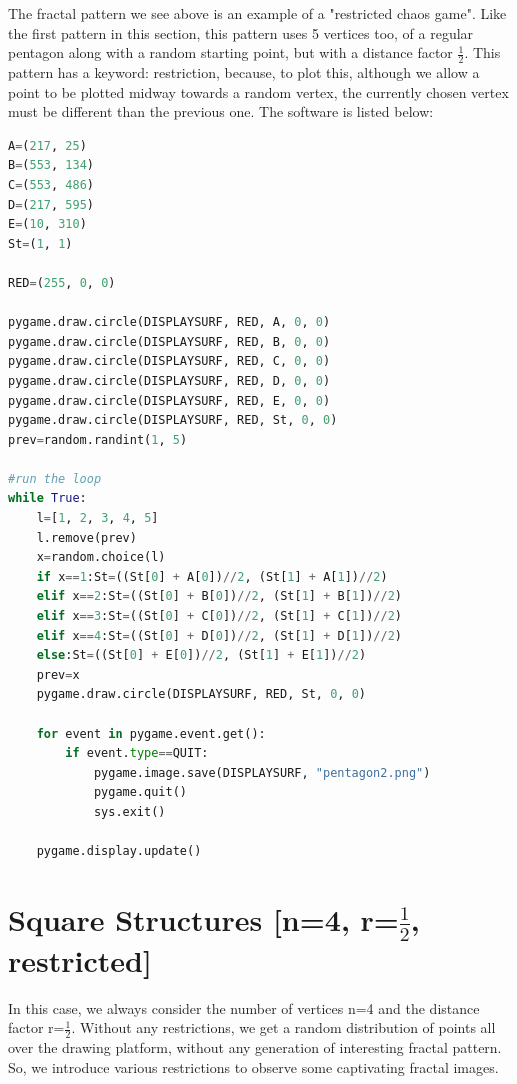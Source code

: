 \documentclass{article}
\begin{document}
The fractal pattern we see above is an example of a "restricted chaos game". Like the first pattern in this section, this pattern uses 5 vertices too, of a regular pentagon along with a random starting point, but with a distance factor $\frac{1}{2}$. This pattern has a keyword: restriction, because, to plot this, although we allow a point to be plotted midway towards a random vertex, the currently chosen vertex must be different than the previous one. The software is listed below:
\begin{lstlisting}[language=Python, frame=single]
A=(217, 25)
B=(553, 134)
C=(553, 486)
D=(217, 595)
E=(10, 310)
St=(1, 1)

RED=(255, 0, 0)

pygame.draw.circle(DISPLAYSURF, RED, A, 0, 0)
pygame.draw.circle(DISPLAYSURF, RED, B, 0, 0)
pygame.draw.circle(DISPLAYSURF, RED, C, 0, 0)
pygame.draw.circle(DISPLAYSURF, RED, D, 0, 0)
pygame.draw.circle(DISPLAYSURF, RED, E, 0, 0)
pygame.draw.circle(DISPLAYSURF, RED, St, 0, 0)
prev=random.randint(1, 5)

#run the loop
while True:
    l=[1, 2, 3, 4, 5]
    l.remove(prev)
    x=random.choice(l)
    if x==1:St=((St[0] + A[0])//2, (St[1] + A[1])//2)
    elif x==2:St=((St[0] + B[0])//2, (St[1] + B[1])//2)
    elif x==3:St=((St[0] + C[0])//2, (St[1] + C[1])//2)
    elif x==4:St=((St[0] + D[0])//2, (St[1] + D[1])//2)
    else:St=((St[0] + E[0])//2, (St[1] + E[1])//2)
    prev=x
    pygame.draw.circle(DISPLAYSURF, RED, St, 0, 0)

    for event in pygame.event.get():
        if event.type==QUIT:
            pygame.image.save(DISPLAYSURF, "pentagon2.png")
            pygame.quit()
            sys.exit()

    pygame.display.update()
\end{lstlisting}
\section{Square Structures [n=4, r=$\frac{1}{2}$, restricted]}
In this case, we always consider the number of vertices n=4 and the distance factor r=$\frac{1}{2}$. Without any restrictions, we get a random distribution of points all over the drawing platform, without any generation of interesting fractal pattern. So, we introduce various restrictions to observe some captivating fractal images.
\end{document}
